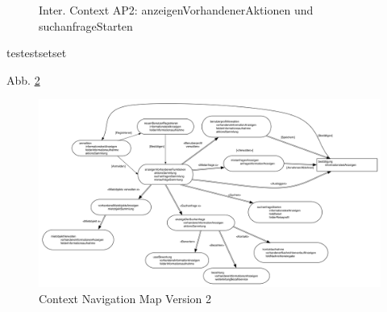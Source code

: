 \begin{figure}[H]
\centering
\hfill
{}
\hfill %
\hfill %
\caption{Inter. Context AP2: anzeigenVorhandenerAktionen und suchanfrageStarten }
\label{interfaceContents2}
\end{figure}

testestsetset

Abb. \ref{fig:navigationmap2}
\begin{figure}[H]
\includegraphics[width=1\textwidth]{./images/navigationmap2.png}
\caption{Context Navigation Map Version 2}
\label{fig:navigationmap2}
\end{figure}


